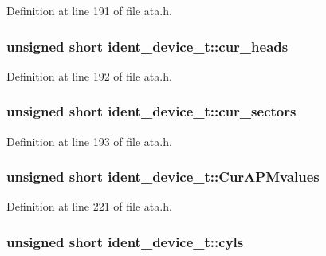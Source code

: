 Definition at line 191 of file ata.\+h.

\subsubsection[{\texorpdfstring{cur\+\_\+heads}{cur_heads}}]{\setlength{\rightskip}{0pt plus 5cm}unsigned short ident\+\_\+device\+\_\+t\+::cur\+\_\+heads}\hypertarget{structident__device__t_a35e272894045c082fa9b34630b270d2c}{}\label{structident__device__t_a35e272894045c082fa9b34630b270d2c}


Definition at line 192 of file ata.\+h.

\subsubsection[{\texorpdfstring{cur\+\_\+sectors}{cur_sectors}}]{\setlength{\rightskip}{0pt plus 5cm}unsigned short ident\+\_\+device\+\_\+t\+::cur\+\_\+sectors}\hypertarget{structident__device__t_ae4e4455f7d44a28f3d2d914739ba73ed}{}\label{structident__device__t_ae4e4455f7d44a28f3d2d914739ba73ed}


Definition at line 193 of file ata.\+h.

\subsubsection[{\texorpdfstring{Cur\+A\+P\+Mvalues}{CurAPMvalues}}]{\setlength{\rightskip}{0pt plus 5cm}unsigned short ident\+\_\+device\+\_\+t\+::\+Cur\+A\+P\+Mvalues}\hypertarget{structident__device__t_a7e34107276efe12de800e1dba6b9e476}{}\label{structident__device__t_a7e34107276efe12de800e1dba6b9e476}


Definition at line 221 of file ata.\+h.

\subsubsection[{\texorpdfstring{cyls}{cyls}}]{\setlength{\rightskip}{0pt plus 5cm}unsigned short ident\+\_\+device\+\_\+t\+::cyls}\hypertarget{structident__device__t_a99303affca63361d7b97f40fd29b1028}{}\label{structident__device__t_a99303affca63361d7b97f40fd29b1028}


